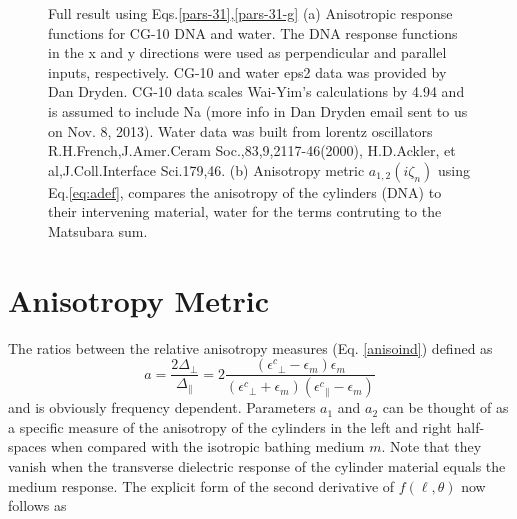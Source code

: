 \documentclass[onecolumn,letterpaper,amsmath,amssymb,floatfix,aps,superscriptaddress]{revtex4}
\begin{document}
\begin{figure}[t!]
\begin{center}
\caption{Full result using Eqs.\ref{pars-31},\ref{pars-31-g} (a) Anisotropic response functions for CG-10 DNA and water. The DNA response functions in the x and y directions were used as perpendicular and parallel inputs, respectively.  CG-10 and water eps2 data was provided by Dan Dryden. CG-10 data scales Wai-Yim's calculations by 4.94 and is assumed to include Na (more info in Dan Dryden email sent to us on Nov. 8, 2013).  Water data was built from lorentz oscillators R.H.French,J.Amer.Ceram Soc.,83,9,2117-46(2000), H.D.Ackler, et al,J.Coll.Interface Sci.179,46.
(b) Anisotropy metric $a_{1,2}(i\zeta_n)$ using Eq.\ref{eq:adef}, compares the anisotropy of the  cylinders (DNA) to their intervening material, water for the terms contruting to the Matsubara sum.}
\label{eiz290}
\end{center}
\end{figure} 

\section{Anisotropy Metric}
The ratios between the relative anisotropy measures (Eq. \ref{anisoind}) defined as 
\begin{equation}
a = \frac{2 \Delta_{\perp}}{\Delta_{\parallel}} = 2 \frac{({\epsilon^{c}}_{\perp}-\epsilon_{m}) \epsilon_{m}}{({\epsilon^{c}}_{\perp}+\epsilon_{m}) ({\epsilon^{c}}_{\parallel}-\epsilon_{m})}
\label{eq:adef}
\end{equation}
and is obviously frequency dependent. Parameters $a_1$ and $a_2$ can be thought of as a specific measure of the anisotropy of the cylinders in the left and right half-spaces when 
compared with the isotropic bathing medium $m$. Note that they vanish when the transverse dielectric response of the cylinder material equals the medium response. 
The explicit form of the second derivative of $f(\ell,\theta)$ now follows as 
\end{document}
